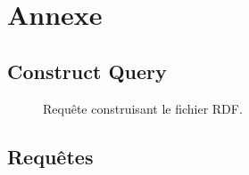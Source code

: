 \chapter{Annexe}
\section{Construct Query}

\begin{figure}[H]

\caption{Requête construisant le fichier RDF.}
\label{1} 
\end{figure}

\section{Requêtes}
